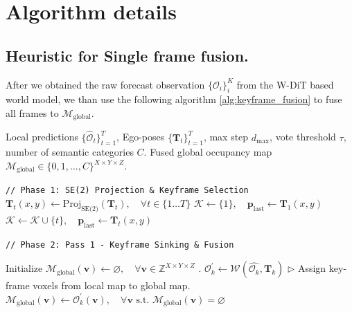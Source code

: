 \section{Algorithm details}
\label{sec:appendix_algorithms}

\subsection{Heuristic for Single frame fusion.} After we obtained the raw forecast observation $\{\mathcal{O}_i\}_{i}^{K}$ from the W-DiT based world model, we than use the following algorithm \ref{alg:keyframe_fusion} to fuse all frames to $\mathcal{M}_{\text{global}}$. 

\begin{algorithm}[h]
\caption{Two-pass Keyframe-based Occupancy Fusion}
\label{alg:keyframe_fusion}
\begin{algorithmic}[1]

\Require Local predictions $\{\hat{\mathcal{O}}_t\}_{t=1}^T$, Ego-poses $\{\mathbf{T}_t\}_{t=1}^T$, max step $d_{\max}$, vote threshold $\tau$, number of semantic categories $C$.
\Ensure Fused global occupancy map $\mathcal{M}_{\text{global}} \in \{0, 1, \dots, C\}^{X \times Y \times Z}$.

\State \texttt{// Phase 1: SE(2) Projection \& Keyframe Selection}
\State $\mathbf{T}_t(x, y) \gets \text{Proj}_{\text{SE(2)}}(\mathbf{T}_t), \quad \forall t \in \{1 \dots T\}$ 
\State $\mathcal{K} \gets \{1\}, \quad \mathbf{p}_{\text{last}} \gets \mathbf{T}_1(x,y)$
        \State $\mathcal{K} \gets \mathcal{K} \cup \{t\}, \quad \mathbf{p}_{\text{last}} \gets \mathbf{T}_t(x,y)$
    \EndIf
\EndFor

\State \texttt{// Phase 2: Pass 1 - Keyframe Sinking \& Fusion}

\State Initialize $\mathcal{M}_{\text{global}}(\mathbf{v}) \gets \varnothing, \quad \forall \mathbf{v} \in \mathbb{Z}^{X \times Y \times Z}$ .
    \State $\mathcal{O}_k^{\prime} \gets \mathcal{W}(\hat{\mathcal{O}_k}, \mathbf{T}_k)$ 
    \State $\triangleright$ Assign key-frame voxels from local map to global map.
    \State $\mathcal{M}_{\text{global}}(\mathbf{v}) \gets \mathcal{O}^{\prime}_k(\mathbf{v}), \quad \forall \mathbf{v} \text{ s.t. } \mathcal{M}_{\text{global}}(\mathbf{v}) = \varnothing$ 
\EndFor


\end{algorithmic}
\end{algorithm}
